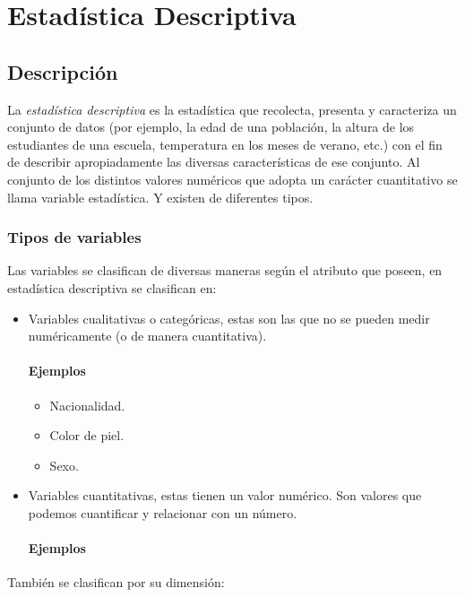 \documentclass[12pt,hidelinks]{article}
\begin{document}
	\section{Estadística Descriptiva}
	\subsection{Descripción}
	La \textit{estadística descriptiva} es la estadística que recolecta, presenta y caracteriza un conjunto de datos (por ejemplo, la edad de una población, la altura de los estudiantes de una escuela, temperatura en los meses de verano, etc.) con el fin de describir apropiadamente las diversas características de ese conjunto. Al conjunto de los distintos valores numéricos que adopta un carácter cuantitativo se llama variable estadística. Y existen de diferentes tipos. 
	\subsubsection{Tipos de variables}
	Las variables se clasifican de diversas maneras según el atributo que poseen, en estadística descriptiva se clasifican en:
	\begin{itemize}
		\item Variables cualitativas o categóricas, estas son las que no se pueden medir numéricamente (o de manera cuantitativa).
		\paragraph{Ejemplos}
		\begin{itemize}
			\item Nacionalidad.
			\item Color de piel.
			\item Sexo.
		\end{itemize}
		\item Variables cuantitativas, estas tienen un valor numérico. Son valores que podemos cuantificar y relacionar con un número.
		\paragraph{Ejemplos}
	\end{itemize}
	También se clasifican por su dimensión:
\end{document}

